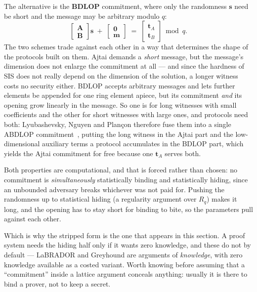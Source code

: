 The alternative is the \textbf{BDLOP} commitment, where only the randomness
$\mathbf{s}$ need be short and the message may be arbitrary modulo $q$:
\[
  \begin{bmatrix}\mathbf{A}\\ \mathbf{B}\end{bmatrix}\mathbf{s}
  \;+\;\begin{bmatrix}\mathbf{0}\\ \mathbf{m}\end{bmatrix}
  \;=\;\begin{bmatrix}\mathbf{t}_A\\ \mathbf{t}_B\end{bmatrix} \bmod q .
\]
The two schemes trade against each other in a way that determines the shape of
the protocols built on them. Ajtai demands a \emph{short} message, but
the message's dimension does not enlarge the commitment at all --- and since the
hardness of SIS does not really depend on the dimension of the solution, a longer
witness costs no security either. BDLOP accepts arbitrary messages and lets
further elements be appended for one ring element apiece, but its commitment
\emph{and} its opening grow linearly in the message. So one is for long witnesses
with small coefficients and the other for short witnesses with large ones, and
protocols need both: Lyubashevsky, Nguyen and Plan\c{c}on therefore fuse them
into a single ABDLOP commitment~\cite{lnp2022}, putting the long witness in the
Ajtai part and the low-dimensional auxiliary terms a protocol accumulates in the
BDLOP part, which yields the Ajtai commitment for free because one $\mathbf{t}_A$
serves both.

Both properties are computational, and that is forced rather than chosen: no
commitment is \emph{simultaneously} statistically binding and statistically
hiding, since an unbounded adversary breaks whichever was not paid for. Pushing
the randomness up to statistical hiding (a regularity argument over $R_q$) makes
it long, and the opening has to stay short for binding to bite, so the parameters
pull against each other.

Which is why the stripped form is the one that appears in this section. A proof
system needs the hiding half only if it wants zero knowledge, and these do not by
default --- LaBRADOR and Greyhound are arguments of \emph{knowledge}, with zero
knowledge available as a costed variant. Worth knowing before assuming that a
``commitment'' inside a lattice argument conceals anything: usually it is there
to bind a prover, not to keep a secret.

